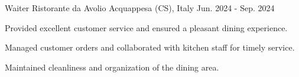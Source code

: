 
\begin{cventries}

  \cventry
    {Waiter} %
    {Ristorante da Avolio} %
    {Acquappesa (CS), Italy} %
    {Jun. 2024 - Sep. 2024} %
    {
      \begin{cvitems} %
        \item {Provided excellent customer service and ensured a pleasant dining experience.}
        \item {Managed customer orders and collaborated with kitchen staff for timely service.}
        \item {Maintained cleanliness and organization of the dining area.}
      \end{cvitems}
    }

\end{cventries}
